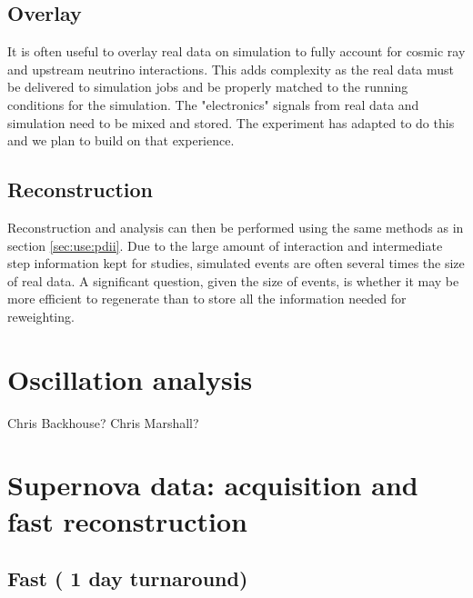 \documentclass[../main-00.tex]{subfiles}
\begin{document}
\subsection{Overlay}\label{sec:use:overlay}
It is often useful to overlay real data on simulation to fully account for cosmic ray and upstream neutrino interactions. This adds complexity as the real data must be delivered to simulation jobs and be properly matched to the running conditions for the simulation.  The "electronics" signals from real data and simulation need to be mixed and stored.  The  experiment has adapted  to do this and we plan to build on that experience. 


\subsection{Reconstruction} \label{sec:use:mcreco}
Reconstruction and analysis can then be performed using the same methods as in section \ref{sec:use:pdii}.  Due to the large amount of interaction and intermediate step information kept for studies, simulated events are often several times the size of real data.  A significant question, given the size of events, is whether it may be more efficient to regenerate than to store all the information needed for reweighting. 











\section{Oscillation analysis} Chris Backhouse?  Chris Marshall? 
\label{sec:use:osc}

\section{Supernova data: acquisition and fast reconstruction}
\label{sec:use:supernova}  %

\subsection{Fast ( 1 day turnaround)} 
\end{document}
